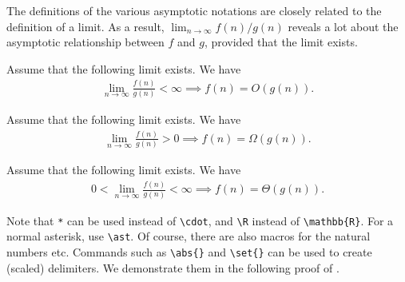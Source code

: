 \documentclass{homework}
\begin{document}
The definitions of the various asymptotic notations are closely related to the definition of a limit. As a result, $\lim_{n \to \infty} f(n) / g(n)$ reveals a lot about the asymptotic relationship between $f$ and $g$, provided that the limit exists.

\begin{lemma}
    Assume that the following limit exists. We have
    \begin{align*}
        \lim_{n \to \infty} \frac{f(n)}{g(n)} < \infty \implies f(n) = O(g(n)).
    \end{align*}
\end{lemma}

\begin{lemma}
    Assume that the following limit exists. We have
    \begin{align*}
        \lim_{n \to \infty} \frac{f(n)}{g(n)} > 0 \implies f(n) = \Omega(g(n)).
    \end{align*}
\end{lemma}

\begin{lemma}
    Assume that the following limit exists. We have
    \begin{align*}
        0 < \lim_{n \to \infty} \frac{f(n)}{g(n)} < \infty \implies f(n) = \Theta(g(n)).
    \end{align*}
\end{lemma}

Note that \texttt{*} can be used instead of \verb|\cdot|, and \verb|\R| instead of \verb|\mathbb{R}|. For a normal asterisk, use \verb|\ast|. Of course, there are also macros for the natural numbers etc. Commands such as \verb|\abs{}| and \verb|\set{}| can be used to create (scaled) delimiters. We demonstrate them in the following proof of .
\end{document}
